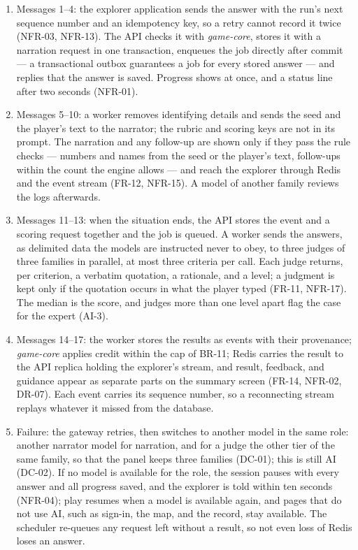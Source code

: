 \begin{enumerate}[leftmargin=1.5em]
  \item Messages 1--4: the explorer application sends the answer with the run's next sequence number and an idempotency key, so a retry cannot record it twice (NFR-03, NFR-13). The API checks it with \textit{game-core}, stores it with a narration request in one transaction, enqueues the job directly after commit --- a transactional outbox\cite{r165} guarantees a job for every stored answer --- and replies that the answer is saved. Progress shows at once, and a status line after two seconds (NFR-01).
  \item Messages 5--10: a worker removes identifying details and sends the seed and the player's text to the narrator; the rubric and scoring keys are not in its prompt. The narration and any follow-up are shown only if they pass the rule checks --- numbers and names from the seed or the player's text, follow-ups within the count the engine allows --- and reach the explorer through Redis and the event stream (FR-12, NFR-15). A model of another family reviews the logs afterwards.
  \item Messages 11--13: when the situation ends, the API stores the event and a scoring request together and the job is queued. A worker sends the answers, as delimited data the models are instructed never to obey, to three judges of three families in parallel, at most three criteria per call. Each judge returns, per criterion, a verbatim quotation, a rationale, and a level; a judgment is kept only if the quotation occurs in what the player typed (FR-11, NFR-17). The median is the score, and judges more than one level apart flag the case for the expert (AI-3).
  \item Messages 14--17: the worker stores the results as events with their provenance; \textit{game-core} applies credit within the cap of BR-11; Redis carries the result to the API replica holding the explorer's stream, and result, feedback, and guidance appear as separate parts on the summary screen (FR-14, NFR-02, DR-07). Each event carries its sequence number, so a reconnecting stream replays whatever it missed from the database.
  \item Failure: the gateway retries, then switches to another model in the same role: another narrator model for narration, and for a judge the other tier of the same family, so that the panel keeps three families (DC-01); this is still AI (DC-02). If no model is available for the role, the session pauses with every answer and all progress saved, and the explorer is told within ten seconds (NFR-04); play resumes when a model is available again, and pages that do not use AI, such as sign-in, the map, and the record, stay available. The scheduler re-queues any request left without a result, so not even loss of Redis loses an answer.
\end{enumerate}

